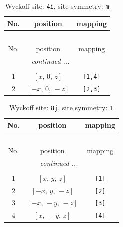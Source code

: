 \documentclass[fleqn,8pt]{jsarticle}
\begin{document}
\renewcommand{\arraystretch}{1.2}
\begin{longtable}{ccc}
\caption{Wyckoff site: {\tt 4i}, site symmetry: {\tt m}}
 \\
 \hline \hline
No. & position & mapping \\ \hline \endfirsthead

\multicolumn{2}{l}{\tablename\ \thetable{}} \\
 \hline \hline
No. & position & mapping \\ \hline \endhead

 \hline \hline
\multicolumn{2}{r}{\footnotesize\it continued ...} \\ \endfoot

 \hline \hline
\multicolumn{2}{r}{} \\ \endlastfoot

1 & $\left[ x,\, 0,\, z \right]$ & {\tt [1,4]} \\ \hline
2 & $\left[ - x,\, 0,\, - z \right]$ & {\tt [2,3]} \\
\end{longtable}
\renewcommand{\arraystretch}{1.2}
\begin{longtable}{ccc}
\caption{Wyckoff site: {\tt 8j}, site symmetry: {\tt 1}}
 \\
 \hline \hline
No. & position & mapping \\ \hline \endfirsthead

\multicolumn{2}{l}{\tablename\ \thetable{}} \\
 \hline \hline
No. & position & mapping \\ \hline \endhead

 \hline \hline
\multicolumn{2}{r}{\footnotesize\it continued ...} \\ \endfoot

 \hline \hline
\multicolumn{2}{r}{} \\ \endlastfoot

1 & $\left[ x,\, y,\, z \right]$ & {\tt [1]} \\ \hline
2 & $\left[ - x,\, y,\, - z \right]$ & {\tt [2]} \\ \hline
3 & $\left[ - x,\, - y,\, - z \right]$ & {\tt [3]} \\ \hline
4 & $\left[ x,\, - y,\, z \right]$ & {\tt [4]} \\
\end{longtable}
\end{document}
